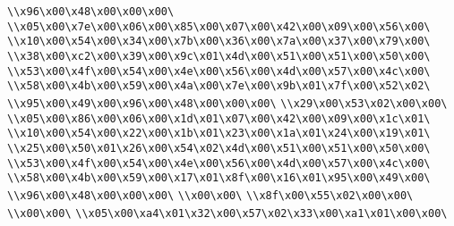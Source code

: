 \verb|\\x96\x00\x48\x00\x00\x00\|\newline
\verb|\\x05\x00\x7e\x00\x06\x00\x85\x00\x07\x00\x42\x00\x09\x00\x56\x00\|\newline
\verb|\\x10\x00\x54\x00\x34\x00\x7b\x00\x36\x00\x7a\x00\x37\x00\x79\x00\|\newline
\verb|\\x38\x00\xc2\x00\x39\x00\x9c\x01\x4d\x00\x51\x00\x51\x00\x50\x00\|\newline
\verb|\\x53\x00\x4f\x00\x54\x00\x4e\x00\x56\x00\x4d\x00\x57\x00\x4c\x00\|\newline
\verb|\\x58\x00\x4b\x00\x59\x00\x4a\x00\x7e\x00\x9b\x01\x7f\x00\x52\x02\|\newline
\verb|\\x95\x00\x49\x00\x96\x00\x48\x00\x00\x00\|\newline
\verb|\\x29\x00\x53\x02\x00\x00\|\newline
\verb|\\x05\x00\x86\x00\x06\x00\x1d\x01\x07\x00\x42\x00\x09\x00\x1c\x01\|\newline
\verb|\\x10\x00\x54\x00\x22\x00\x1b\x01\x23\x00\x1a\x01\x24\x00\x19\x01\|\newline
\verb|\\x25\x00\x50\x01\x26\x00\x54\x02\x4d\x00\x51\x00\x51\x00\x50\x00\|\newline
\verb|\\x53\x00\x4f\x00\x54\x00\x4e\x00\x56\x00\x4d\x00\x57\x00\x4c\x00\|\newline
\verb|\\x58\x00\x4b\x00\x59\x00\x17\x01\x8f\x00\x16\x01\x95\x00\x49\x00\|\newline
\verb|\\x96\x00\x48\x00\x00\x00\|\newline
\verb|\\x00\x00\|\newline
\verb|\\x8f\x00\x55\x02\x00\x00\|\newline
\verb|\\x00\x00\|\newline
\verb|\\x05\x00\xa4\x01\x32\x00\x57\x02\x33\x00\xa1\x01\x00\x00\|\newline
